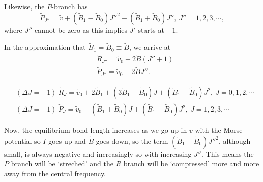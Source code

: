 Likewise, the $P$-branch has 
\begin{equation}
\widetilde{P}_{J''}=\tilde{v}+(\widetilde{B}_1-\widetilde{B}_0)J''^2-(\widetilde{B}_1+\widetilde{B}_0)J'',\ J''=1,2,3,\cdots, 
\end{equation}
where $J''$ cannot be zero as this implies $J'$ starts at $-1$.\par
In the approximation that $\widetilde{B}_1=\widetilde{B}_0\equiv\widetilde{B}$, we arrive at 
\begin{equation}
\begin{aligned}
&\widetilde{R}_{J''}=\tilde{v}_0+2\widetilde{B}(J''+1)\\
&\widetilde{P}_{J''}=\tilde{v}_0-2\widetilde{B}J''.
\end{aligned}
\end{equation}
\begin{prt}
\begin{equation}
\begin{aligned}
&(\Delta J=+1)\ \widetilde{R}_{J}=\tilde{v}_0+2\widetilde{B}_1+(3\widetilde{B}_1-\widetilde{B}_0)J+(\widetilde{B}_1-\widetilde{B}_0)J^2 ,\ J=0,1,2,\cdots\\
&(\Delta J=-1)\ \widetilde{P}_{J}=\tilde{v}_0-(\widetilde{B}_1+\widetilde{B}_0)J+(\widetilde{B}_1-\widetilde{B}_0)J^2,\ J=1,2,3,\cdots
\end{aligned}
\end{equation}
\end{prt}
Now, the equilibrium bond length increases as we go up in $v$ with the Morse potential so 
$I$ goes up and $\widetilde{B}$ goes down, so the term $(\widetilde{B}_1-\widetilde{B}_0)J''^2$, although small, 
is always negative and increasingly so with increasing $J''$. 
This means the $P$ branch will be `streched' and the $R$ branch will be `compressed' more and more 
away from the central frequency. 
